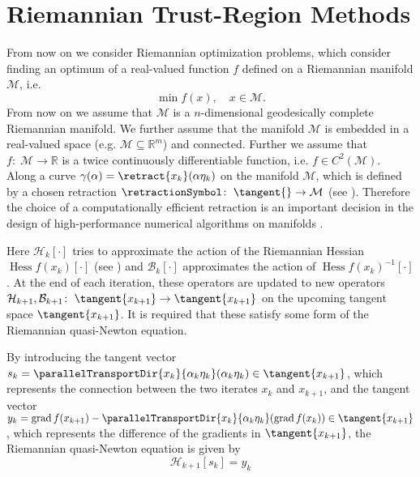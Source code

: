 \section{Riemannian Trust-Region Methods}


From now on we consider Riemannian optimization problems, which consider finding an optimum of a real-valued function $f$ defined on a Riemannian manifold $\mathcal{M}$, i.e.
\begin{equation*}
    \min f(x), \quad x \in \mathcal{M}.
\end{equation*}
From now on we assume that $\mathcal{M}$ is a $n$-dimensional geodesically complete Riemannian manifold. We further assume that the manifold $\mathcal{M}$ is embedded in a real-valued space (e.g. $\mathcal{M} \subseteq \mathbb{R}^m$) and connected. Further we assume that $f \colon \; \mathcal{M} \to \mathbb{R}$ is a twice continuously differentiable function, i.e. $f \in C^2(\mathcal{M})$. \\
Along a curve $\gamma(\alpha) = \retract{x_k}(\alpha \eta_k)$ on the manifold $\mathcal{M}$, which is defined by a chosen retraction $\retractionSymbol \colon \; \tangent{} \to \mathcal{M}$ (see \cite[Definition~4.1.1]{AbsilMahonySepulchre:2008}). Therefore the choice of a computationally efficient retraction is an important decision in the design of high-performance numerical algorithms on manifolds \cite[p.~54]{AbsilMahonySepulchre:2008}.

Here $\mathcal{H}_k [\cdot]$ tries to approximate the action of the Riemannian Hessian $\operatorname{Hess} f(x_k) [\cdot]$ (see \cite[Definition~5.5.1]{AbsilMahonySepulchre:2008}) and $\mathcal{B}_k [\cdot]$ approximates the action of ${\operatorname{Hess} f(x_k)}^{-1} [\cdot]$. At the end of each iteration, these operators are updated to new operators $\mathcal{H}_{k+1}, \mathcal{B}_{k+1} \colon \; \tangent{x_{k+1}} \to \tangent{x_{k+1}}$ on the upcoming tangent space $\tangent{x_{k+1}}$. It is required that these satisfy some form of the Riemannian quasi-Newton equation. 

By introducing the tangent vector $s_k = \parallelTransportDir{x_k}{\alpha_k \eta_k}(\alpha_k \eta_k) \in \tangent{x_{k+1}}$, which represents the connection between the two iterates $x_k$ and $x_{k+1}$, and the tangent vector $y_k = \operatorname{grad} f(x_{k+1}) - \parallelTransportDir{x_k}{\alpha_k \eta_k}(\operatorname{grad} f(x_k)) \in \tangent{x_{k+1}}$, which represents the difference of the gradients in $\tangent{x_{k+1}}$, the Riemannian quasi-Newton equation is given by 
\begin{equation*}
    \mathcal{H}_{k+1} [s_k] = y_k 
\end{equation*}

